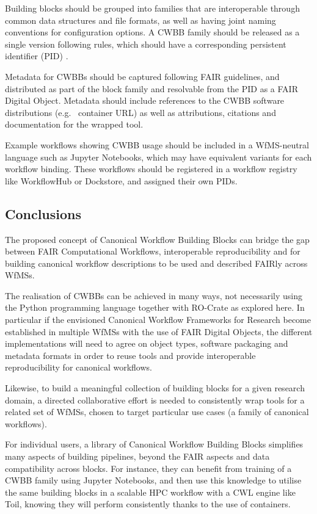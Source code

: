 Building blocks should be grouped into families that are interoperable through common data structures and file formats, as well as having joint naming conventions for configuration options.
A CWBB family should be released as a single version following  rules, which should have a corresponding persistent identifier (PID) \cite{McMurry 2017}.

Metadata for CWBBs should be captured following FAIR guidelines, and distributed as part of the block family and resolvable from the PID as a FAIR Digital Object.
Metadata should include references to the CWBB software distributions (e.g.~ container URL) as well as attributions, citations and documentation for the wrapped tool.

Example workflows showing CWBB usage should be included in a WfMS-neutral language such as Jupyter Notebooks, which may have equivalent variants for each workflow binding.
These workflows should be registered in a workflow registry like WorkflowHub or Dockstore, and assigned their own PIDs.

\subsection{Conclusions}\label{ch6:conclusions}

The proposed concept of Canonical Workflow Building Blocks can bridge the gap between FAIR Computational Workflows, interoperable reproducibility and for building canonical workflow descriptions to be used and described FAIRly across WfMSs.

The realisation of CWBBs can be achieved in many ways, not necessarily using the Python programming language together with RO-Crate as explored here.
In particular if the envisioned Canonical Workflow Frameworks for Research become established in multiple WfMSs with the use of FAIR Digital Objects, the different implementations will need to agree on object types, software packaging and metadata formats in order to reuse tools and provide interoperable reproducibility for canonical workflows.

Likewise, to build a meaningful collection of building blocks for a given research domain, a directed collaborative effort is needed to consistently wrap tools for a related set of WfMSs, chosen to target particular use cases (a family of canonical workflows).

For individual users, a library of Canonical Workflow Building Blocks simplifies many aspects of building pipelines, beyond the FAIR aspects and data compatibility across blocks.
For instance, they can benefit from training of a CWBB family using Jupyter Notebooks, and then use this knowledge to utilise the same building blocks in a scalable HPC workflow with a CWL engine like Toil, knowing they will perform consistently thanks to the use of containers.

